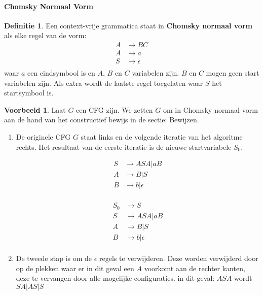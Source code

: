 \documentclass[12pt,a4paper]{article}
\theoremstyle{definition}
\newtheorem{defi}{Definitie}[section]
\newtheorem{vb}{Voorbeeld}[section]
\newcommand{\ra}{\ensuremath{\rightarrow}}
\begin{document}
\paragraph{Chomsky Normaal Vorm}
	\begin{defi}
		Een context-vrije grammatica staat in \textbf{Chomsky normaal vorm} als elke regel van de vorm: 
		\begin{align*}
		A &\ra BC\\
		A &\ra a\\
		S &\ra \epsilon\\
		\end{align*}
		waar $a$ een eindsymbool is en $A$, $B$ en $C$ variabelen zijn. $B$ en $C$ mogen geen start variabelen zijn. Als extra wordt de laatste regel toegelaten waar $S$ het startsymbool is.
	\end{defi}
	\begin{vb}
		Laat $G$ een CFG zijn. We zetten $G$ om in Chomsky normaal vorm aan de hand van het constructief bewijs in de sectie: Bewijzen.
		\begin{enumerate}
			\item De originele CFG $G$ staat links en de volgende iteratie van het algoritme rechts. Het resultaat van de eerste iteratie is de nieuwe startvariabele $S_0$.\\
			\begin{minipage}{.4\textwidth}
				\begin{align*}
				S&\ra ASA | aB\\
				A&\ra B|S\\
				B&\ra b|\epsilon\\
				\end{align*}
			\end{minipage}
			\begin{minipage}{.3\textwidth}
				\begin{align*}
				S_0&\ra S\\
				S&\ra ASA | aB\\
				A&\ra B|S\\
				B&\ra b|\epsilon\\
				\end{align*}
			\end{minipage}
			\item De tweede stap is om de $\epsilon$ regels te verwijderen. Deze worden verwijderd door op de plekken waar er in dit geval een $A$ voorkomt aan de rechter kanten, deze te vervangen door alle mogelijke configuraties. in dit geval: $ASA$ wordt $SA|AS|S$ \\

\end{enumerate}
\end{vb}
\end{document}
